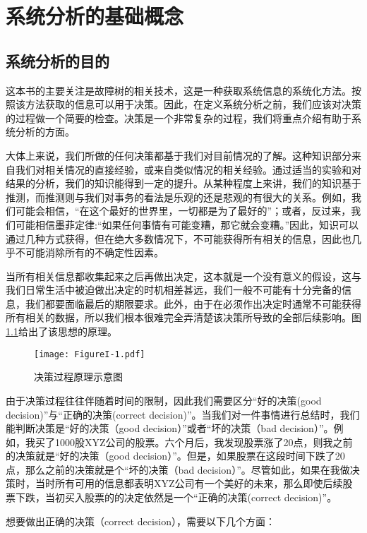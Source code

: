 \documentclass[cn,11pt,chinese]{elegantbook}
\begin{document}
\mainmatter
\chapter{系统分析的基础概念}
\section{系统分析的目的}

这本书的主要关注是故障树的相关技术，这是一种获取系统信息的系统化方法。按照该方法获取的信息可以用于决策。因此，在定义系统分析之前，我们应该对决策的过程做一个简要的检查。决策是一个非常复杂的过程，我们将重点介绍有助于系统分析的方面。

大体上来说，我们所做的任何决策都基于我们对目前情况的了解。这种知识部分来自我们对相关情况的直接经验，或来自类似情况的相关经验。通过适当的实验和对结果的分析，我们的知识能得到一定的提升。从某种程度上来讲，我们的知识基于推测，而推测则与我们对事务的看法是乐观的还是悲观的有很大的关系。例如，我们可能会相信，“在这个最好的世界里，一切都是为了最好的”；或者，反过来，我们可能相信墨菲定律:“如果任何事情有可能变糟，那它就会变糟。”因此，知识可以通过几种方式获得，但在绝大多数情况下，不可能获得所有相关的信息，因此也几乎不可能消除所有的不确定性因素。

当所有相关信息都收集起来之后再做出决定，这本就是一个没有意义的假设，这与我们日常生活中被迫做出决定的时机相差甚远，我们一般不可能有十分完备的信息，我们都要面临最后的期限要求。此外，由于在必须作出决定时通常不可能获得所有相关的数据，所以我们根本很难完全弄清楚该决策所导致的全部后续影响。图\ref{fig: fig1_1}给出了该思想的原理。

\begin{figure}[htpb]
	\centering
	\texttt{[image: FigureI-1.pdf]}
	\caption{决策过程原理示意图}\label{fig: fig1_1}
\end{figure}

由于决策过程往往伴随着时间的限制，因此我们需要区分“好的决策(good decision)”与“正确的决策(correct decision)”。当我们对一件事情进行总结时，我们能判断决策是“好的决策（good decision）”或者“坏的决策（bad decision）”。例如，我买了1000股XYZ公司的股票。六个月后，我发现股票涨了20点，则我之前的决策就是“好的决策（good decision）”。但是，如果股票在这段时间下跌了20点，那么之前的决策就是个“坏的决策（bad decision）”。尽管如此，如果在我做决策时，当时所有可用的信息都表明XYZ公司有一个美好的未来，那么即使后续股票下跌，当初买入股票的的决定依然是一个“正确的决策(correct decision)”。

想要做出正确的决策（correct decision），需要以下几个方面：
\end{document}
